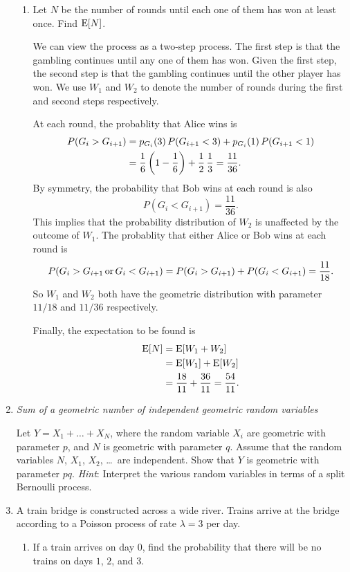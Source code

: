 \begin{enumerate}
\begin{enumerate}
  \item Let \(N\) be the number of rounds until each one of them has
    won at least once.  Find \(\operatorname{E}[N]\).

    We can view the process as a two-step process.  The first step is
    that the gambling continues until any one of them has won.  Given
    the first step, the second step is that the gambling continues
    until the other player has won.  We use \(W_1\) and \(W_2\) to denote the
    number of rounds during the first and second steps respectively.

    At each round, the probablity that Alice wins is
    \begin{align*}
      P(G_i > G_{i+1}) &= p_{G_i}(3) \, P(G_{i+1} < 3) + p_{G_i}(1) \, P(G_{i+1} < 1) \\
                       &= \frac16 \left( 1 - \frac16 \right) + \frac12 \, \frac13 = \frac{11}{36}.
    \end{align*}
    By symmetry, the probability that Bob wins at each round is also
    \[P(G_i < G_{i+1}) = \frac{11}{36}.\]
    This implies that the probability distribution of \(W_2\) is
    unaffected by the outcome of \(W_1\).  The probablity that either
    Alice or Bob wins at each round is
    \[P(G_i > G_{i+1} \mathop{\text{or}} G_i < G_{i+1}) = P(G_i > G_{i+1}) + P(G_i < G_{i+1}) = \frac{11}{18}.\]
    So \(W_1\) and \(W_2\) both have the geometric distribution with
    parameter \(11/18\) and \(11/36\) respectively.

    Finally, the expectation to be found is
    \begin{align*}
      \operatorname{E}[N] &= \operatorname{E}[W_1 + W_2] \\
            &= \operatorname{E}[W_1] + \operatorname{E}[W_2] \\
            &= \frac{18}{11} + \frac{36}{11} = \frac{54}{11}.
    \end{align*}
  \end{enumerate}

\item \emph{Sum of a geometric number of independent geometric random variables}

  Let \(Y = X_1 + \dots + X_N\), where the random variable \(X_i\) are
  geometric with parameter \(p\), and \(N\) is geometric with
  parameter \(q\).  Assume that the random variables \(N\), \(X_1\),
  \(X_2\), \dots\ are independent.  Show that \(Y\) is geometric with
  parameter \(pq\).  \emph{Hint}: Interpret the various random variables in
  terms of a split Bernoulli process.

\item A train bridge is constructed across a wide river.  Trains
  arrive at the bridge according to a Poisson process of rate
  \(λ = 3\) per day.
  \begin{enumerate} \parasp
  \item If a train arrives on day \(0\), find the probability that there
    will be no trains on days \(1\), \(2\), and \(3\).


\end{enumerate}
\end{enumerate}
